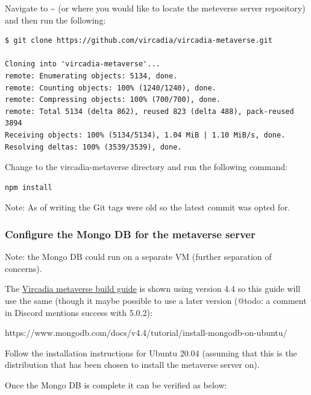 Navigate to \textasciitilde{} (or where you would like to locate the
meteverse server repository) and then run the following:

\begin{verbatim}
$ git clone https://github.com/vircadia/vircadia-metaverse.git

Cloning into 'vircadia-metaverse'...
remote: Enumerating objects: 5134, done.
remote: Counting objects: 100% (1240/1240), done.
remote: Compressing objects: 100% (700/700), done.
remote: Total 5134 (delta 862), reused 823 (delta 488), pack-reused 3894
Receiving objects: 100% (5134/5134), 1.04 MiB | 1.10 MiB/s, done.
Resolving deltas: 100% (3539/3539), done.
\end{verbatim}

Change to the vircadia-metaverse directory and run the following
command:

\begin{verbatim}
npm install
\end{verbatim}

Note: As of writing the Git tags were old so the latest commit was opted
for.

\hypertarget{configure-the-mongo-db-for-the-metaverse-server}{%
\subsubsection{Configure the Mongo DB for the metaverse
server}\label{configure-the-mongo-db-for-the-metaverse-server}}

Note: the Mongo DB could run on a separate VM (further separation of
concerns).

The
\href{https://github.com/vircadia/vircadia-metaverse/blob/master/docs/Building.md}{Vircadia
metaverse build guide} is shown using version 4.4 so this guide will use
the same (though it maybe possible to use a later version (@todo: a
comment in Discord mentions success with 5.0.2):

https://www.mongodb.com/docs/v4.4/tutorial/install-mongodb-on-ubuntu/

Follow the installation instructions for Ubuntu 20.04 (assuming that
this is the distribution that has been chosen to install the metaverse
server on).

Once the Mongo DB is complete it can be verified as below:

